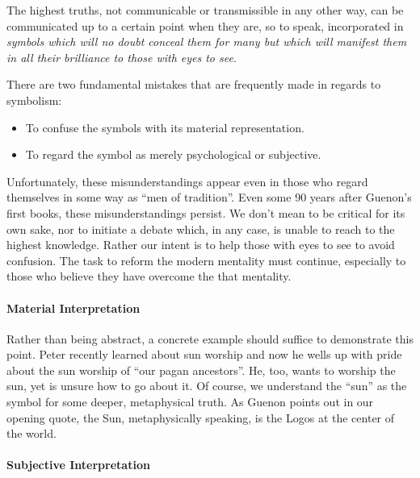 \begin{quotex}
The highest truths, not communicable or transmissible in any other way, can be communicated up to a certain point when they are, so to speak, incorporated in \emph{symbols which will no doubt conceal them for many but which will manifest them in all their brilliance to those with eyes to see}.
\end{quotex}


There are two fundamental mistakes that are frequently made in regards to symbolism:

\begin{itemize}


\item To confuse the symbols with its material representation.

\item To regard the symbol as merely psychological or subjective.
\end{itemize}


Unfortunately, these misunderstandings appear even in those who regard themselves in some way as ``men of tradition''. Even some 90 years after Guenon's first books, these misunderstandings persist. We don't mean to be critical for its own sake, nor to initiate a debate which, in any case, is unable to reach to the highest knowledge. Rather our intent is to help those with eyes to see to avoid confusion. The task to reform the modern mentality must continue, especially to those who believe they have overcome the that mentality.

\paragraph{Material Interpretation}


Rather than being abstract, a concrete example should suffice to demonstrate this point. Peter recently learned about sun worship and now he wells up with pride about the sun worship of ``our pagan ancestors''. He, too, wants to worship the sun, yet is unsure how to go about it. Of course, we understand the ``sun'' as the symbol for some deeper, metaphysical truth. As Guenon points out in our opening quote, the Sun, metaphysically speaking, is the Logos at the center of the world.

\paragraph{Subjective Interpretation}


